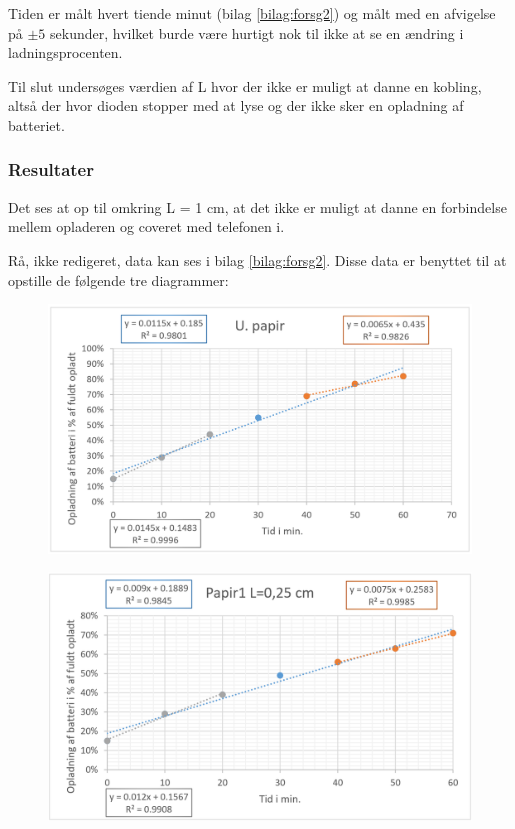 Tiden er målt hvert tiende minut (bilag \ref{bilag:forsg2}) og målt med en afvigelse på $\pm 5$ sekunder, hvilket burde være hurtigt nok til ikke at se en ændring i ladningsprocenten.

Til slut undersøges værdien af L hvor der ikke er muligt at danne en kobling, altså der hvor dioden stopper med at lyse og der ikke sker en opladning af batteriet.

\subsubsection{Resultater}
Det ses at op til omkring L = 1 cm, at det ikke er muligt at danne en forbindelse mellem opladeren og coveret med telefonen i.

Rå, ikke redigeret, data kan ses i bilag \ref{bilag:forsg2}. Disse data er benyttet til at opstille de følgende tre diagrammer:

\begin{figure}[H]
\centering
\includegraphics[width=1\textwidth]{Setup/forsg2_graf1}
\caption{}
\label{figure:graf1}
\end{figure}

\begin{figure}[H]
\centering
\includegraphics[width=1\textwidth]{Setup/forsg2_graf22}
\caption{}
\label{figure:graf2}
\end{figure}

